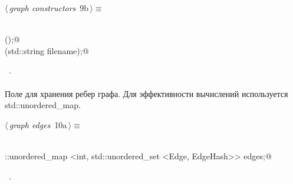 \documentclass[12pt]{article}
\begin{document}
\begin{flushleft} \small
\begin{minipage}{\linewidth}\label{scrap8}\raggedright\small
{} $\langle\,${\itshape graph constructors}\nobreak\ {\footnotesize {9b}}$\,\rangle\equiv$
\vspace{-1ex}
\begin{list}{}{} \item
\mbox{}\verb@@\\
\mbox{}\verb@Graph();@\\
\mbox{}\verb@Graph(std::string filename);@\\
\mbox{}\verb@@{\NWsep}
\end{list}
\vspace{-1.5ex}
\footnotesize
\begin{list}{}{\setlength{\itemsep}{-\parsep}\setlength{\itemindent}{-\leftmargin}}
\item \NWtxtMacroRefIn\ .

\item{}
\end{list}
\end{minipage}\vspace{4ex}
\end{flushleft}
\paragraph{}
Поле для хранения ребер графа. Для эффективности вычислений используется std::unordered\_map. 

\begin{flushleft} \small
\begin{minipage}{\linewidth}\label{scrap9}\raggedright\small
{} $\langle\,${\itshape graph edges}\nobreak\ {\footnotesize {10a}}$\,\rangle\equiv$
\vspace{-1ex}
\begin{list}{}{} \item
\mbox{}\verb@@\\
\mbox{}\verb@std::unordered_map <int, std::unordered_set <Edge, EdgeHash>> edges;@\\
\mbox{}\verb@@{\NWsep}
\end{list}
\vspace{-1.5ex}
\footnotesize
\begin{list}{}{\setlength{\itemsep}{-\parsep}\setlength{\itemindent}{-\leftmargin}}
\item \NWtxtMacroRefIn\ .

\item{}
\end{list}
\end{minipage}\vspace{4ex}
\end{flushleft}
\end{document}
